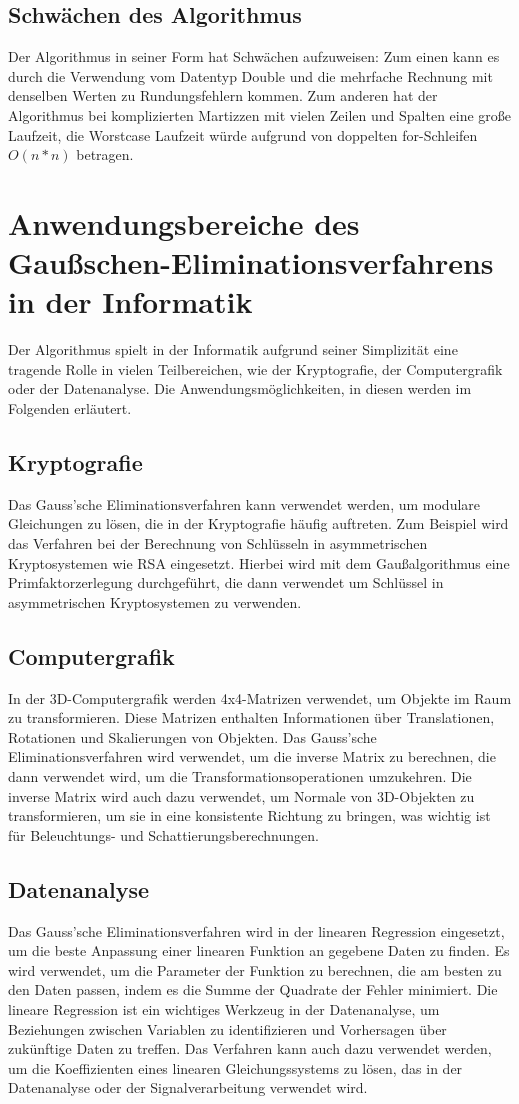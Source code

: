 \documentclass[a4paper, 12pt]{report}
\begin{document}
\begin{sloppypar}
\section{Schwächen des Algorithmus}
Der Algorithmus in seiner Form hat Schwächen aufzuweisen:
Zum einen kann es durch die Verwendung vom Datentyp Double und die mehrfache Rechnung mit denselben Werten zu Rundungsfehlern kommen.
Zum anderen hat der Algorithmus bei komplizierten Martizzen mit vielen Zeilen und Spalten eine große Laufzeit, die Worstcase Laufzeit würde aufgrund von doppelten for-Schleifen $ O(n*n) $ betragen.
\chapter{Anwendungsbereiche des Gaußschen-Eliminationsverfahrens in der Informatik}
Der Algorithmus spielt in der Informatik aufgrund seiner Simplizität eine tragende Rolle in vielen Teilbereichen, wie der Kryptografie, der Computergrafik oder der Datenanalyse. Die Anwendungsmöglichkeiten, in diesen werden im Folgenden erläutert.
\section{Kryptografie}
Das Gauss'sche Eliminationsverfahren kann verwendet werden, um modulare Gleichungen zu lösen, die in der Kryptografie häufig auftreten.
Zum Beispiel wird das Verfahren bei der Berechnung von Schlüsseln in asymmetrischen Kryptosystemen wie RSA eingesetzt. Hierbei wird mit dem Gaußalgorithmus eine Primfaktorzerlegung durchgeführt, die dann
verwendet um Schlüssel in asymmetrischen Kryptosystemen zu verwenden.
\section{Computergrafik}
In der 3D-Computergrafik werden 4x4-Matrizen verwendet, um Objekte im Raum zu transformieren. Diese Matrizen enthalten Informationen über Translationen, Rotationen und Skalierungen von Objekten. Das Gauss'sche Eliminationsverfahren wird verwendet, um die inverse Matrix zu berechnen, die dann verwendet wird, um die Transformationsoperationen umzukehren. Die inverse Matrix wird auch dazu verwendet, um Normale von 3D-Objekten zu transformieren, um sie in eine konsistente Richtung zu bringen, was wichtig ist für Beleuchtungs- und Schattierungsberechnungen.

\section{Datenanalyse}
Das Gauss'sche Eliminationsverfahren wird in der linearen Regression eingesetzt, um die beste Anpassung einer linearen Funktion an gegebene Daten zu finden. Es wird verwendet, um die Parameter der Funktion zu berechnen, die am besten zu den Daten passen, indem es die Summe der Quadrate der Fehler minimiert. Die lineare Regression ist ein wichtiges Werkzeug in der Datenanalyse, um Beziehungen zwischen Variablen zu identifizieren und Vorhersagen über zukünftige Daten zu treffen. Das Verfahren kann auch dazu verwendet werden, um die Koeffizienten eines linearen Gleichungssystems zu lösen, das in der Datenanalyse oder der Signalverarbeitung verwendet wird.

\end{sloppypar}
\end{document}
